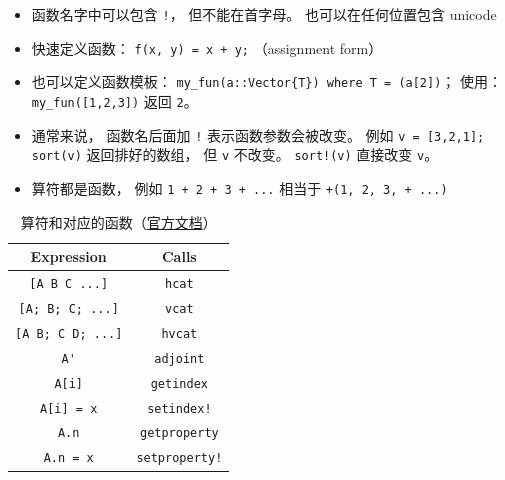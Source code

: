 
\begin{issues}
\issueDraft
\end{issues}

\begin{itemize}
\item 函数名字中可以包含 \verb`!`， 但不能在首字母。 也可以在任何位置包含 unicode
\item 快速定义函数： \verb`f(x, y) = x + y;` （assignment form）
\item 也可以定义函数模板： \verb`my_fun(a::Vector{T}) where T = (a[2])`； 使用： \verb`my_fun([1,2,3])` 返回 \verb`2`。
\item 通常来说， 函数名后面加 \verb`!` 表示函数参数会被改变。 例如 \verb`v = [3,2,1]; sort(v)` 返回排好的数组， 但 \verb`v` 不改变。 \verb`sort!(v)` 直接改变 \verb`v`。
\item 算符都是函数， 例如 \verb`1 + 2 + 3 + ...` 相当于 \verb`+(1, 2, 3, + ...)`
\end{itemize}


\begin{table}[ht]
\centering
\caption{算符和对应的函数（\href{https://docs.julialang.org/en/v1/manual/functions/}{官方文档}）}\label{tab_JuFunc_1}
\begin{tabular}{|c|c|}
\hline
Expression & Calls \\
\hline
\verb`[A B C ...]` & \verb`hcat` \\
\hline
\verb`[A; B; C; ...]` & \verb`vcat` \\
\hline
\verb`[A B; C D; ...]` & \verb`hvcat` \\
\hline
\verb`A'` & \verb`adjoint` \\
\hline
\verb`A[i]` & \verb`getindex` \\
\hline
\verb`A[i] = x` & \verb`setindex!` \\
\hline
\verb`A.n` & \verb`getproperty` \\
\hline
\verb`A.n = x` & \verb`setproperty!` \\
\hline
\end{tabular}
\end{table}

